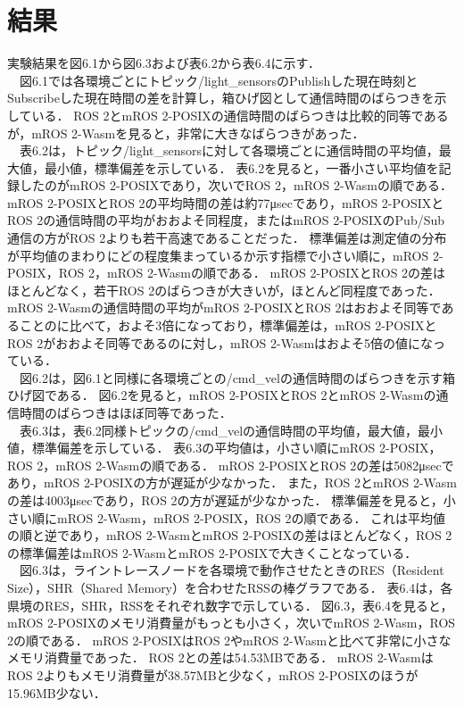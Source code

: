 \section{結果}
実験結果を図6.1から図6.3および表6.2から表6.4に示す．
\\　図6.1では各環境ごとにトピック/light\_sensorsのPublishした現在時刻とSubscribeした現在時間の差を計算し，箱ひげ図として通信時間のばらつきを示している．
ROS 2とmROS 2-POSIXの通信時間のばらつきは比較的同等であるが，mROS 2-Wasmを見ると，非常に大きなばらつきがあった．
\\　表6.2は，トピック/light\_sensorsに対して各環境ごとに通信時間の平均値，最大値，最小値，標準偏差を示している．
表6.2を見ると，一番小さい平均値を記録したのがmROS 2-POSIXであり，次いでROS 2，mROS 2-Wasmの順である．
mROS 2-POSIXとROS 2の平均時間の差は約77μsecであり，mROS 2-POSIXとROS 2の通信時間の平均がおおよそ同程度，またはmROS 2-POSIXのPub/Sub通信の方がROS 2よりも若干高速であることだった．
標準偏差は測定値の分布が平均値のまわりにどの程度集まっているか示す指標で小さい順に，mROS 2-POSIX，ROS 2，mROS 2-Wasmの順である．
mROS 2-POSIXとROS 2の差はほとんどなく，若干ROS 2のばらつきが大きいが，ほとんど同程度であった．
mROS 2-Wasmの通信時間の平均がmROS 2-POSIXとROS 2はおおよそ同等であることのに比べて，およそ3倍になっており，標準偏差は，mROS 2-POSIXとROS 2がおおよそ同等であるのに対し，mROS 2-Wasmはおよそ5倍の値になっている．
\\　図6.2は，図6.1と同様に各環境ごとの/cmd\_velの通信時間のばらつきを示す箱ひげ図である．
図6.2を見ると，mROS 2-POSIXとROS 2とmROS 2-Wasmの通信時間のばらつきはほぼ同等であった．
\\　表6.3は，表6.2同様トピックの/cmd\_velの通信時間の平均値，最大値，最小値，標準偏差を示している．
表6.3の平均値は，小さい順にmROS 2-POSIX，ROS 2，mROS 2-Wasmの順である．
mROS 2-POSIXとROS 2の差は5082μsecであり，mROS 2-POSIXの方が遅延が少なかった．
また，ROS 2とmROS 2-Wasmの差は4003μsecであり，ROS 2の方が遅延が少なかった．
標準偏差を見ると，小さい順にmROS 2-Wasm，mROS 2-POSIX，ROS 2の順である．
これは平均値の順と逆であり，mROS 2-WasmとmROS 2-POSIXの差はほとんどなく，ROS 2の標準偏差はmROS 2-WasmとmROS 2-POSIXで大きくことなっている．
\\　図6.3は，ライントレースノードを各環境で動作させたときのRES（Resident Size），SHR（Shared Memory）を合わせたRSSの棒グラフである．
表6.4は，各県境のRES，SHR，RSSをそれぞれ数字で示している．
図6.3，表6.4を見ると，mROS 2-POSIXのメモリ消費量がもっとも小さく，次いでmROS 2-Wasm，ROS 2の順である．
mROS 2-POSIXはROS 2やmROS 2-Wasmと比べて非常に小さなメモリ消費量であった．
ROS 2との差は54.53MBである．
mROS 2-WasmはROS 2よりもメモリ消費量が38.57MBと少なく，mROS 2-POSIXのほうが15.96MB少ない．
